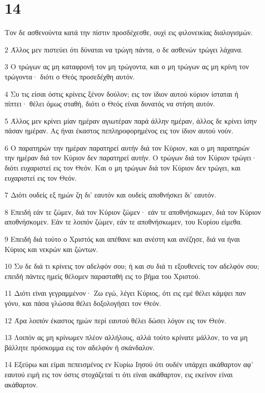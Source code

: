 \chapter{14}

\par Τον δε ασθενούντα κατά την πίστιν προσδέχεσθε, ουχί εις φιλονεικίας διαλογισμών.
\par 2 Άλλος μεν πιστεύει ότι δύναται να τρώγη πάντα, ο δε ασθενών τρώγει λάχανα.
\par 3 Ο τρώγων ας μη καταφρονή τον μη τρώγοντα, και ο μη τρώγων ας μη κρίνη τον τρώγοντα· διότι ο Θεός προσεδέχθη αυτόν.
\par 4 Συ τις είσαι όστις κρίνεις ξένον δούλον; εις τον ίδιον αυτού κύριον ίσταται ή πίπτει· θέλει όμως σταθή, διότι ο Θεός είναι δυνατός να στήση αυτόν.
\par 5 Άλλος μεν κρίνει μίαν ημέραν αγιωτέραν παρά άλλην ημέραν, άλλος δε κρίνει ίσην πάσαν ημέραν. Ας ήναι έκαστος πεπληροφορημένος εις τον ίδιον αυτού νούν.
\par 6 Ο παρατηρών την ημέραν παρατηρεί αυτήν διά τον Κύριον, και ο μη παρατηρών την ημέραν διά τον Κύριον δεν παρατηρεί αυτήν. Ο τρώγων διά τον Κύριον τρώγει· διότι ευχαριστεί εις τον Θεόν. Και ο μη τρώγων διά τον Κύριον δεν τρώγει, και ευχαριστεί εις τον Θεόν.
\par 7 Διότι ουδείς εξ ημών ζη δι' εαυτόν και ουδείς αποθνήσκει δι' εαυτόν.
\par 8 Επειδή εάν τε ζώμεν, διά τον Κύριον ζώμεν· εάν τε αποθνήσκωμεν, διά τον Κύριον αποθνήσκομεν. Εάν τε λοιπόν ζώμεν, εάν τε αποθνήσκωμεν, του Κυρίου είμεθα.
\par 9 Επειδή διά τούτο ο Χριστός και απέθανε και ανέστη και ανέζησε, διά να ήναι Κύριος και νεκρών και ζώντων.
\par 10 Συ δε διά τι κρίνεις τον αδελφόν σου; ή και συ διά τι εξουθενείς τον αδελφόν σου; επειδή πάντες ημείς θέλομεν παρασταθή εις το βήμα του Χριστού.
\par 11 Διότι είναι γεγραμμένον· Ζω εγώ, λέγει Κύριος, ότι εις εμέ θέλει κάμψει παν γόνυ, και πάσα γλώσσα θέλει δοξολογήσει τον Θεόν.
\par 12 Άρα λοιπόν έκαστος ημών περί εαυτού θέλει δώσει λόγον εις τον Θεόν.
\par 13 Λοιπόν ας μη κρίνωμεν πλέον αλλήλους, αλλά τούτο κρίνατε μάλλον, το να μη βάλλητε πρόσκομμα εις τον αδελφόν ή σκάνδαλον.
\par 14 Εξεύρω και είμαι πεπεισμένος εν Κυρίω Ιησού ότι ουδέν υπάρχει ακάθαρτον αφ' εαυτού ειμή εις τον όστις στοχάζεταί τι ότι είναι ακάθαρτον, εις εκείνον είναι ακάθαρτον.
